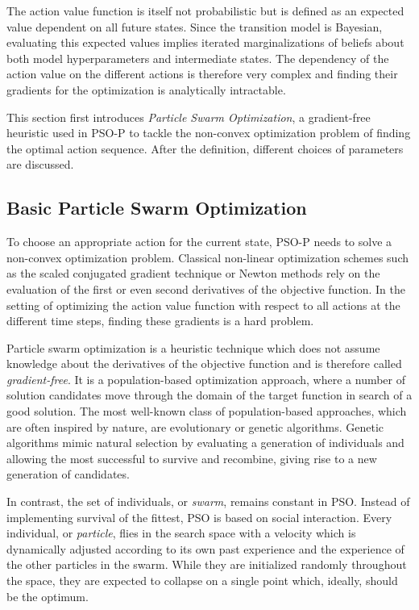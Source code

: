 The action value function is itself not probabilistic but is defined as an expected value dependent on all future states.
Since the transition model is Bayesian, evaluating this expected values implies iterated marginalizations of beliefs about both model hyperparameters and intermediate states.
The dependency of the action value on the different actions is therefore very complex and finding their gradients for the optimization is analytically intractable.

This section first introduces \emph{Particle Swarm Optimization}, a gradient-free heuristic used in PSO-P to tackle the non-convex optimization problem of finding the optimal action sequence.
After the definition, different choices of parameters are discussed.

\subsection{Basic Particle Swarm Optimization}
To choose an appropriate action for the current state, PSO-P needs to solve a non-convex optimization problem.
Classical non-linear optimization schemes such as the scaled conjugated gradient technique or Newton methods \cite{press_numerical_2007} rely on the evaluation of the first or even second derivatives of the objective function.
In the setting of optimizing the action value function with respect to all actions at the different time steps, finding these gradients is a hard problem.

Particle swarm optimization is a heuristic technique which does not assume knowledge about the derivatives of the objective function and is therefore called \emph{gradient-free}.
It is a population-based optimization approach, where a number of solution candidates move through the domain of the target function in search of a good solution.
The most well-known class of population-based approaches, which are often inspired by nature, are evolutionary or genetic algorithms.
Genetic algorithms mimic natural selection by evaluating a generation of individuals and allowing the most successful to survive and recombine, giving rise to a new generation of candidates.

In contrast, the set of individuals, or \emph{swarm}, remains constant in PSO.
Instead of implementing survival of the fittest, PSO is based on social interaction.
Every individual, or \emph{particle}, flies in the search space with a velocity which is dynamically adjusted according to its own past experience and the experience of the other particles in the swarm.
While they are initialized randomly throughout the space, they are expected to collapse on a single point which, ideally, should be the optimum.

